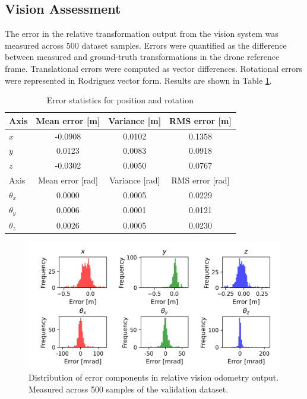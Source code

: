 \documentclass[bare_jrnl_transmag]{subfiles}
\begin{document}
\subsection{Vision Assessment}
The error in the relative transformation output from the vision system was measured across 500 dataset samples. Errors were quantified as the difference between measured and ground-truth transformations in the drone reference frame. Translational errors were computed as vector differences. Rotational errors were represented in Rodriguez vector form. Results are shown in Table \ref{tab:vision-error-stats}.

\begin{table}[H]
    \centering
    \begin{tabular}{lccc}
    \hline
    Axis & Mean error [m] & Variance [m] & RMS error [m] \\ \hline
    $x$ & -0.0908 & 0.0102 & 0.1358 \\
    $y$ & 0.0123 & 0.0083 & 0.0918 \\
    $z$ & -0.0302 & 0.0050 & 0.0767 \\ \hline
    Axis & Mean error [rad] & Variance [rad] & RMS error [rad] \\ \hline
    $\theta_x$ & 0.0000 & 0.0005 & 0.0229 \\
    $\theta_y$ & 0.0006 & 0.0001 & 0.0121 \\
    $\theta_z$ & 0.0026 & 0.0005 & 0.0230 \\ \hline
    \end{tabular}
    \caption{Error statistics for position and rotation}
    \label{tab:vision-error-stats}
\end{table}

\begin{figure}[H]
    \centering
    \includegraphics[width=0.9\linewidth]{figures/vision_error.png}
    \caption{Distribution of error components in relative vision odometry output. Measured across 500 samples of the validation dataset.}
    \label{fig:vision-error-results}
\end{figure}
\end{document}
